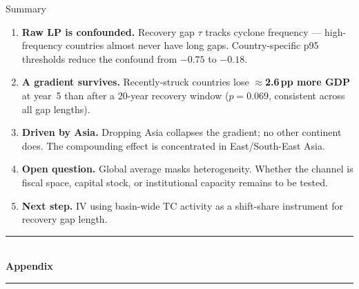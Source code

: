 \documentclass[aspectratio=169,c]{beamer}
\begin{document}
\begin{frame}{Summary}
\small\vspace{-2pt}
\begin{enumerate}
  \item \textbf{Raw LP is confounded.} Recovery gap $\tau$ tracks cyclone frequency
        --- high-frequency countries almost never have long gaps.
        Country-specific p95 thresholds reduce the confound from $-0.75$ to $-0.18$.

  \item \textbf{A gradient survives.} Recently-struck countries lose \textbf{$\approx$2.6\,pp more
        GDP} at year~5 than after a 20-year recovery window ($p = 0.069$,
        consistent across all gap lengths).

  \item \textbf{Driven by Asia.} Dropping Asia collapses the gradient; no
        other continent does. The compounding effect is concentrated in
        East/South-East Asia.

  \item \textbf{Open question.} Global average masks heterogeneity.
        Whether the channel is fiscal space, capital stock, or institutional
        capacity remains to be tested.

  \item \textbf{Next step.} IV using basin-wide TC activity as a shift-share
        instrument for recovery gap length.
\end{enumerate}
\normalsize
\end{frame}

\appendix

\begin{frame}
\centering
\vfill
{\color{primary!40}\rule{0.35\textwidth}{0.4pt}}\\[1.2em]
{\LARGE\bfseries\color{primary}Appendix}\\[1.2em]
{\color{primary!40}\rule{0.35\textwidth}{0.4pt}}
\vfill
\end{frame}

\end{document}

